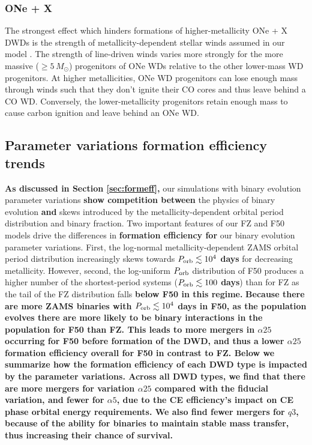 \documentclass[twocolumn, linenumbers]{aastex631}
\begin{document}
\subsubsection{\textbf{ONe + X}}\label{formeff_ONe}
The strongest effect which hinders formations of higher-metallicity ONe + X DWDs is the strength of metallicity-dependent stellar winds assumed in our model \citep{Vink2001}. The strength of line-driven winds varies more strongly for the more massive ($\geq5\,M_\odot$) progenitors of ONe WDs relative to the other lower-mass WD progenitors. At higher metallicities, ONe WD progenitors can lose enough mass through winds such that they don't ignite their CO cores and thus leave behind a CO WD. Conversely, the lower-metallicity progenitors retain enough mass to cause carbon ignition and leave behind an ONe WD. 


\subsection{Parameter variations formation efficiency trends}\label{subsec:formeff_vars}

\textbf{As discussed in Section \ref{sec:formeff},} our simulations with binary evolution parameter variations \textbf{show competition between} the physics of binary evolution \textbf{and} skews introduced by the metallicity-dependent orbital period distribution and binary fraction. Two important features of our FZ and F50 models drive the differences in \textbf{formation efficiency for} our binary evolution parameter variations. First, the log-normal metallicity-dependent ZAMS orbital period distribution increasingly skews towards \textbf{$P_{\rm{orb}}\lesssim 10^4$ days} for decreasing metallicity. However, second, the log-uniform $P_{\rm{orb}}$ distribution of F50 produces a higher number of the shortest-period systems (\textbf{$P_{\rm{orb}}\lesssim 100$ days}) than for FZ as the tail of the FZ distribution falls \textbf{below F50 in this regime.} \textbf{Because there are more ZAMS binaries with $P_{\rm{orb}} \lesssim 10^4$ days in F50, as the population evolves there are more likely to be binary interactions in the population for F50 than FZ. This leads to more mergers in $\alpha25$ occurring for F50 before formation of the DWD, and thus a lower $\alpha25$ formation efficiency overall for F50 in contrast to FZ. Below we summarize how the formation efficiency of each DWD type is impacted by the parameter variations. Across all DWD types, we find that there are more mergers for variation $\alpha25$ compared with the fiducial variation, and fewer for $\alpha5$, due to the CE efficiency's impact on CE phase orbital energy requirements. We also find fewer mergers for $q3$, because of the ability for binaries to maintain stable mass transfer, thus increasing their chance of survival.}
\end{document}
